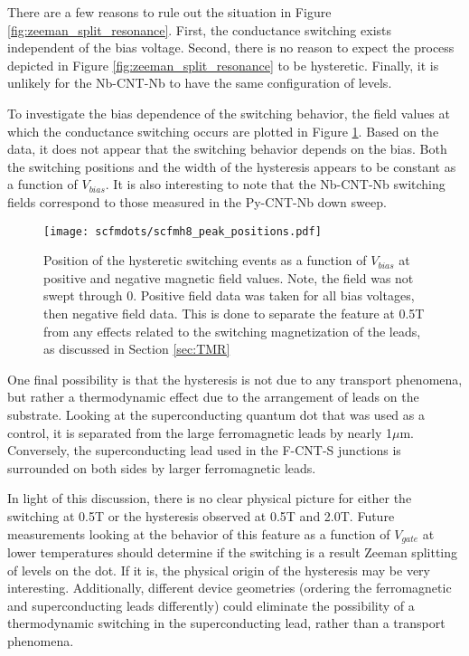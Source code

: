 There are a few reasons to rule out the situation in Figure \ref{fig:zeeman_split_resonance}. First, the conductance switching exists independent of the bias voltage. Second, there is no reason to expect the process depicted in Figure \ref{fig:zeeman_split_resonance} to be hysteretic. Finally, it is unlikely for the Nb-CNT-Nb to have the same configuration of levels.

To investigate the bias dependence of the switching behavior, the field values at which the conductance switching occurs are plotted in Figure \ref{fig:scfmh8_peak_positions}. Based on the data, it does not appear that the switching behavior depends on the bias. Both the switching positions and the width of the hysteresis appears to be constant as a function of $V_{bias}$. It is also interesting to note that the Nb-CNT-Nb switching fields correspond to those measured in the Py-CNT-Nb down sweep.

\begin{figure}
    \centering
    \texttt{[image: scfmdots/scfmh8\_peak\_positions.pdf]}
    \caption{Position of the hysteretic switching events as a function of $V_{bias}$ at positive and negative magnetic field values. Note, the field was not swept through 0. Positive field data was taken for all bias voltages, then negative field data. This is done to separate the feature at 0.5T from any effects related to the switching magnetization of the leads, as discussed in Section \ref{sec:TMR}}
    \label{fig:scfmh8_peak_positions}
\end{figure}

One final possibility is that the hysteresis is not due to any transport phenomena, but rather a thermodynamic effect due to the arrangement of leads on the substrate. Looking at the superconducting quantum dot that was used as a control, it is separated from the large ferromagnetic leads by nearly 1$\mu$m. Conversely, the superconducting lead used in the F-CNT-S junctions is surrounded on both sides by larger ferromagnetic leads. 

In light of this discussion, there is no clear physical picture for either the switching at 0.5T or the hysteresis observed at 0.5T and 2.0T. Future measurements looking at the behavior of this feature as a function of $V_{gate}$ at lower temperatures should determine if the switching is a result Zeeman splitting of levels on the dot. If it is, the physical origin of the hysteresis may be very interesting. Additionally, different device geometries (ordering the ferromagnetic and superconducting leads differently) could eliminate the possibility of a thermodynamic switching in the superconducting lead, rather than a transport phenomena.